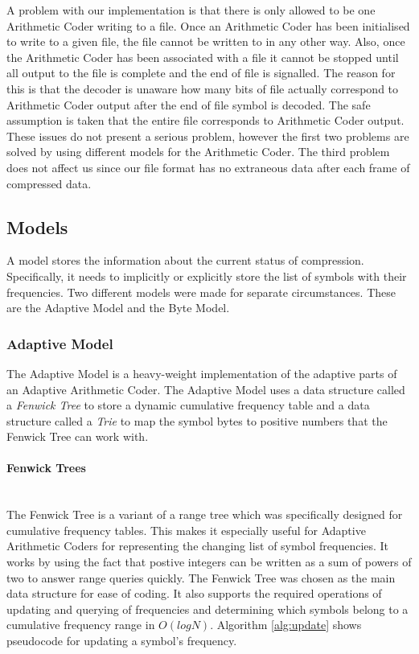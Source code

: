 \documentclass[a4paper,11pt]{report}
\begin{document}
A problem with our implementation is that there is only allowed to be one Arithmetic Coder writing to a file. Once an Arithmetic Coder has been initialised to write to a given file, the file cannot be written to in any other way. Also, once the Arithmetic Coder has been associated with a file it cannot be stopped until all output to the file is complete and the end of file is signalled. The reason for this is that the decoder is unaware how many bits of file actually correspond to Arithmetic Coder output after the end of file symbol is decoded. The safe assumption is taken that the entire file corresponds to Arithmetic Coder output. These issues do not present a serious problem, however the first two problems are solved by using different models for the Arithmetic Coder. The third problem does not affect us since our file format has no extraneous data after each frame of compressed data.

\subsection{Models}

A model stores the information about the current status of compression. Specifically, it needs to implicitly or explicitly store the list of symbols with their frequencies. Two different models were made for separate circumstances. These are the Adaptive Model and the Byte Model.

\subsubsection{Adaptive Model}

The Adaptive Model is a heavy-weight implementation of the adaptive parts of an Adaptive Arithmetic Coder. The Adaptive Model uses a data structure called a \emph{Fenwick Tree}\cite{fenwick1994new} to store a dynamic cumulative frequency table and a data structure called a \emph{Trie}\cite{maly1976compressed} to map the symbol bytes to positive numbers that the Fenwick Tree can work with.

\paragraph{Fenwick Trees} \ \\
The Fenwick Tree is a variant of a range tree which was specifically designed for cumulative frequency tables. This makes it especially useful for Adaptive Arithmetic Coders for representing the changing list of symbol frequencies. It works by using the fact that postive integers can be written as a sum of powers of two to answer range queries quickly. The Fenwick Tree was chosen as the main data structure for ease of coding. It also supports the required operations of updating and querying of frequencies and determining which symbols belong to a cumulative frequency range in $O(logN)$. Algorithm \ref{alg:update} shows pseudocode for updating a symbol's frequency.
\end{document}

